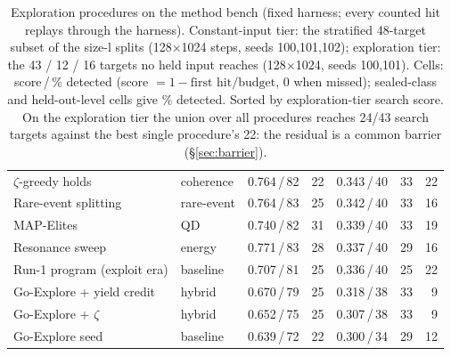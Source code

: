 \begin{table}[t]
\begin{tabular}{llrrrrr}
$\zeta$-greedy holds & coherence & 0.764\,/\,82 & 22 & 0.343\,/\,40 & 33 & 22 \\
Rare-event splitting & rare-event & 0.764\,/\,83 & 25 & 0.342\,/\,40 & 33 & 16 \\
MAP-Elites & QD & 0.740\,/\,82 & 31 & 0.339\,/\,40 & 33 & 19 \\
Resonance sweep & energy & 0.771\,/\,83 & 28 & 0.337\,/\,40 & 29 & 16 \\
Run-1 program (exploit era) & baseline & 0.707\,/\,81 & 25 & 0.336\,/\,40 & 25 & 22 \\
Go-Explore + yield credit & hybrid & 0.670\,/\,79 & 25 & 0.318\,/\,38 & 33 & 9 \\
Go-Explore + $\zeta$ & hybrid & 0.652\,/\,75 & 25 & 0.307\,/\,38 & 33 & 9 \\
Go-Explore seed & baseline & 0.639\,/\,72 & 22 & 0.300\,/\,34 & 29 & 12 \\
\bottomrule\end{tabular}
\caption{Exploration procedures on the method bench (fixed harness; every counted hit replays through the harness). Constant-input tier: the stratified 48-target subset of the size-l splits (128$\times$1024 steps, seeds 100,101,102); exploration tier: the 43 / 12 / 16 targets no held input reaches (128$\times$1024, seeds 100,101). Cells: score\,/\,\% detected (score $=1-\text{first hit}/\text{budget}$, 0 when missed); sealed-class and held-out-level cells give \% detected. Sorted by exploration-tier search score. On the exploration tier the union over all procedures reaches 24/43 search targets against the best single procedure's 22: the residual is a common barrier (\S\ref{sec:barrier}).}
\label{tab:methods}\end{table}
